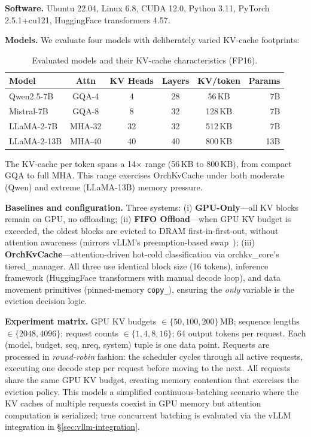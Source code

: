 \documentclass[conference]{IEEEtran}
\begin{document}
\textbf{Software.} Ubuntu 22.04, Linux 6.8, CUDA 12.0, Python 3.11, PyTorch 2.5.1+cu121, HuggingFace transformers 4.57.

\textbf{Models.} We evaluate four models with deliberately varied KV-cache footprints:

\begin{table}[t]
\centering
\caption{Evaluated models and their KV-cache characteristics (FP16).}
\label{tab:models}
\small
\begin{tabular}{@{}lccccr@{}}
\toprule
Model & Attn & KV Heads & Layers & KV/token & Params \\
\midrule
Qwen2.5-7B   & GQA-4  & 4  & 28 & 56\,KB  & 7B  \\
Mistral-7B   & GQA-8  & 8  & 32 & 128\,KB & 7B  \\
LLaMA-2-7B   & MHA-32 & 32 & 32 & 512\,KB & 7B  \\
LLaMA-2-13B  & MHA-40 & 40 & 40 & 800\,KB & 13B \\
\bottomrule
\end{tabular}
\end{table}

The KV-cache per token spans a 14$\times$ range (56\,KB to 800\,KB), from compact GQA to full MHA. This range exercises OrchKvCache under both moderate (Qwen) and extreme (LLaMA-13B) memory pressure.

\textbf{Baselines and configuration.} Three systems: (i) \textbf{GPU-Only}---all KV blocks remain on GPU, no offloading; (ii) \textbf{FIFO Offload}---when GPU KV budget is exceeded, the oldest blocks are evicted to DRAM first-in-first-out, without attention awareness (mirrors vLLM's preemption-based swap~\cite{vllm}); (iii) \textbf{OrchKvCache}---attention-driven hot-cold classification via orchkv\_core's tiered\_manager. All three use identical block size (16 tokens), inference framework (HuggingFace transformers with manual decode loop), and data movement primitives (pinned-memory \texttt{copy\_}), ensuring the \emph{only} variable is the eviction decision logic.

\textbf{Experiment matrix.} GPU KV budgets $\in \{50, 100, 200\}$\,MB; sequence lengths $\in \{2048, 4096\}$; request counts $\in \{1, 4, 8, 16\}$; 64 output tokens per request. Each (model, budget, seq, nreq, system) tuple is one data point. Requests are processed in \emph{round-robin} fashion: the scheduler cycles through all active requests, executing one decode step per request before moving to the next. All requests share the same GPU KV budget, creating memory contention that exercises the eviction policy. This models a simplified continuous-batching scenario where the KV caches of multiple requests coexist in GPU memory but attention computation is serialized; true concurrent batching is evaluated via the vLLM integration in \S\ref{sec:vllm-integration}.
\end{document}
